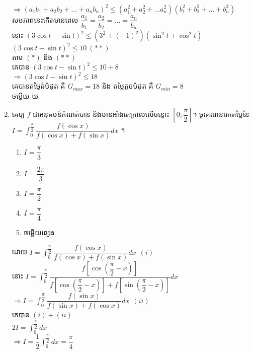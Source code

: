 \documentclass[a4paper,12pt]{article}
\begin{document}
\begin{enumerate}[m]
\begin{center}
\begin{center}
			$\Rightarrow\left(a_1b_1+a_2b_2+\dots+a_nb_n\right)^2\le\left(a_1^2+a_2^2+\dots a_n^2\right)\left(b_1^2+b_2^2+\dots +b_n^2\right)$\\
			សមភាពនេះកើតមានពេល $\dfrac{a_1}{b_1}=\dfrac{a_2}{b_2}=\dots=\dfrac{a_n}{b_n}$\\
			នោះ $\left(3\cos t-\sin t\right)^2\le\left(3^2+\left(-1\right)^2\right)\left(\sin^2t+\cos^2t\right)$\\
			$\left(3\cos t-\sin t\right)^2\le10~(**)$\\
			តាម $(*)$ និង $(**)$\\
			គេបាន $\left(3\cos t-\sin t\right)^2\le10+8$\\
			$\Rightarrow \left(3\cos t-\sin t\right)^2\le18$\\
			គេបានតម្លៃធំបំផុត គឺ $G_{max}=18$ និង តម្លៃតូចបំផុត គឺ $G_{min}=8$\\
			\kml ចម្លើយ \kbk ឃ
		\end{center}
	\end{center}
	{\color{blue}\hrulefill}
	\item គេឲ្យ $f$ ជាអនុគមន៍កំណត់បាន និងមានអាំងតេក្រាលលើចន្លោះ $\left[0;\dfrac{\pi}{2}\right]$។ ចូរគណនារកតម្លៃនៃ $I=\int_{0}^{\dfrac{\pi}{2}}\dfrac{f\left(\cos x\right)}{f\left(\cos x\right)+f\left(\sin x\right)}dx$ ។\\
	\begin{enumerate}[k,5]
		\item $I=\dfrac{\pi}{3}$
		\item $I=\dfrac{2\pi}{3}$
		\item $I=\dfrac{\pi}{2}$
		\item $I=\dfrac{\pi}{4}$
		\item ចម្លើយផ្សេង
	\end{enumerate}
	\answer
	\begin{center}
		ដោយ $I=\int_{0}^{\dfrac{\pi}{2}}\dfrac{f\left(\cos x\right)}{f\left(\cos x\right)+f\left(\sin x\right)}dx~~(i)$\\
		នោះ $I=\int_{0}^{\dfrac{\pi}{2}}\dfrac{f\left[\cos \left(\dfrac{\pi}{2}-x\right)\right]}{f\left[\cos \left(\dfrac{\pi}{2}-x\right)\right]+f\left[\sin \left(\dfrac{\pi}{2}-x\right)\right]}dx$\\
		$\Rightarrow I=\int_{0}^{\dfrac{\pi}{2}}\dfrac{f\left(\sin x\right)}{f\left(\sin x\right)+f\left(\cos x\right)}dx~~(ii)$\\
		គេបាន $(i)+(ii)$\\
		$2I=\int_{0}^{\dfrac{\pi}{2}}dx$\\
		$\Rightarrow I=\dfrac{1}{2}\int_{0}^{\dfrac{\pi}{2}}dx=\dfrac{\pi}{4}$\\

\end{center}
\end{enumerate}
\end{document}
